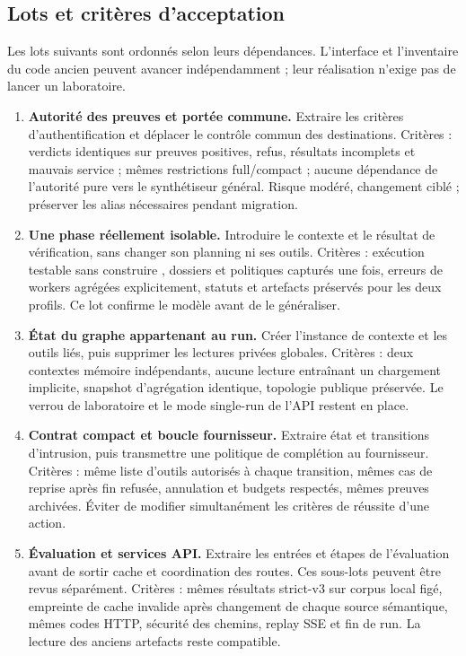 \documentclass[11pt,a4paper]{article}
\newcommand{\code}[1]{{\ttfamily\path{#1}}}
\begin{document}
\subsection{Lots et critères d'acceptation}
Les lots suivants sont ordonnés selon leurs dépendances. L'interface et
l'inventaire du code ancien peuvent avancer indépendamment ; leur réalisation
n'exige pas de lancer un laboratoire.

\begin{enumerate}[label=\textbf{\arabic*.}]
\item \textbf{Autorité des preuves et portée commune.}
Extraire les critères d'authentification et déplacer le contrôle commun des
destinations. Critères : verdicts identiques sur preuves positives, refus,
résultats incomplets et mauvais service ; mêmes restrictions full/compact ;
aucune dépendance de l'autorité pure vers le synthétiseur général. Risque
modéré, changement ciblé ; préserver les alias nécessaires pendant migration.

\item \textbf{Une phase réellement isolable.}
Introduire le contexte et le résultat de vérification, sans changer son
planning ni ses outils. Critères : exécution testable sans construire
\code{Pipeline}, dossiers et politiques capturés une fois, erreurs de workers
agrégées explicitement, statuts et artefacts préservés pour les deux profils.
Ce lot confirme le modèle avant de le généraliser.

\item \textbf{État du graphe appartenant au run.}
Créer l'instance de contexte et les outils liés, puis supprimer les lectures
privées globales. Critères : deux contextes mémoire indépendants, aucune
lecture entraînant un chargement implicite, snapshot d'agrégation identique,
topologie publique préservée. Le verrou de laboratoire et le mode single-run
de l'API restent en place.

\item \textbf{Contrat compact et boucle fournisseur.}
Extraire état et transitions d'intrusion, puis transmettre une politique de
complétion au fournisseur. Critères : même liste d'outils autorisés à chaque
transition, mêmes cas de reprise après fin refusée, annulation et budgets
respectés, mêmes preuves archivées. Éviter de modifier simultanément les
critères de réussite d'une action.

\item \textbf{Évaluation et services API.}
Extraire les entrées et étapes de l'évaluation avant de sortir cache et
coordination des routes. Ces sous-lots peuvent être revus séparément.
Critères : mêmes résultats strict-v3 sur corpus local figé, empreinte de cache
invalide après changement de chaque source sémantique, mêmes codes HTTP,
sécurité des chemins, replay SSE et fin de run. La lecture des anciens
artefacts reste compatible.


\end{enumerate}
\end{document}
